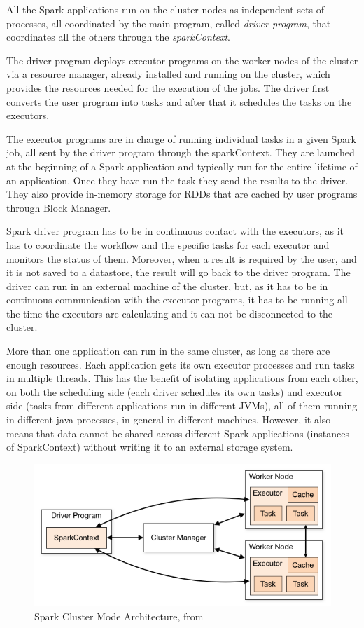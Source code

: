 \documentclass[11pt]{article} %
\begin{document}
      All the Spark applications run on the cluster nodes as independent sets of processes, all coordinated by the main program, called \emph{driver program}, that coordinates all the others through the \emph{sparkContext}.

      The driver program deploys executor programs on the worker nodes of the cluster via a resource manager, already installed and running on the cluster, which provides the resources needed for the execution of the jobs. The driver first converts the user program into tasks and after that it schedules the tasks on the executors.

      The executor programs are in charge of running individual tasks in a given Spark job, all sent by the driver program through the sparkContext. They are launched at the beginning of a Spark application and typically run for the entire lifetime of an application. Once they have run the task they send the results to the driver. They also provide in-memory storage for RDDs that are cached by user programs through Block Manager.

      Spark driver program has to be in continuous contact with the executors, as it has to coordinate the workflow and the specific tasks for each executor and monitors the status of them. Moreover, when a result is required by the user, and it is not saved to a datastore, the result will go back to the driver program. The driver can run in an external machine of the cluster, but, as it has to be in continuous communication with the executor programs, it has to be running all the time the executors are calculating and it can not be disconnected to the cluster.

      More than one application can run in the same cluster, as long as there are enough resources. Each application gets its own executor processes and run tasks in multiple threads. This has the benefit of isolating applications from each other, on both the scheduling side (each driver schedules its own tasks) and executor side (tasks from different applications run in different JVMs), all of them running in different java processes, in general in different machines. However, it also means that data cannot be shared across different Spark applications (instances of SparkContext) without writing it to an external storage system.

      \begin{figure}[!ht]
        \centering
        \includegraphics[width=\textwidth]{cluster-overview.png}
        \caption{Spark Cluster Mode Architecture, from \cite{spark_documentation}}
        \label{img:spark_architecture}
      \end{figure}
\end{document}

